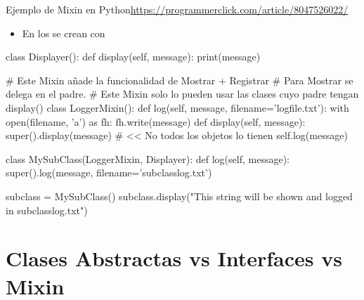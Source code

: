 \documentclass[10pt, envcountsect , spanish]{beamer}
\begin{document}
\begin{frame}[fragile]{Ejemplo de Mixin en Python}{\url{https://programmerclick.com/article/8047526022/}}

\begin{itemize}
\item En  los  se crean con 
\end{itemize}

\footnotesize
\begin{pyverbatim}[][frame=single, fontsize=\scriptsize]
class Displayer():
    def display(self, message):
        print(message)

# Este Mixin añade la funcionalidad de Mostrar + Registrar
# Para Mostrar se delega en el padre.
# Este Mixin solo lo pueden usar las clases cuyo padre tengan display()    
class LoggerMixin():
    def log(self, message, filename='logfile.txt'):
        with open(filename, 'a') as fh:
            fh.write(message)
    def display(self, message):
        super().display(message) # << No todos los objetos lo tienen
        self.log(message)

class MySubClass(LoggerMixin, Displayer):
    def log(self, message):
        super().log(message, filename='subclasslog.txt')

subclass = MySubClass()
subclass.display("This string will be shown and logged in subclasslog.txt")
\end{pyverbatim}

\end{frame}







\section{Clases Abstractas vs Interfaces vs Mixin}
\end{document}
